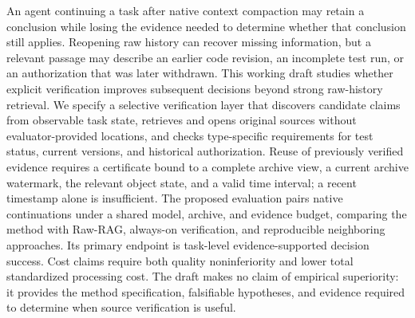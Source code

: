An agent continuing a task after native context compaction may retain a
conclusion while losing the evidence needed to determine whether that
conclusion still applies. Reopening raw history can recover missing
information, but a relevant passage may describe an earlier code
revision, an incomplete test run, or an authorization that was later
withdrawn. This working draft studies whether explicit verification
improves subsequent decisions beyond strong raw-history retrieval. We
specify a selective verification layer that discovers candidate claims
from observable task state, retrieves and opens original sources without
evaluator-provided locations, and checks type-specific requirements for
test status, current versions, and historical authorization. Reuse of
previously verified evidence requires a certificate bound to a complete
archive view, a current archive watermark, the relevant object state,
and a valid time interval; a recent timestamp alone is insufficient. The
proposed evaluation pairs native continuations under a shared model,
archive, and evidence budget, comparing the method with Raw-RAG,
always-on verification, and reproducible neighboring approaches. Its
primary endpoint is task-level evidence-supported decision success. Cost
claims require both quality noninferiority and lower total standardized
processing cost. The draft makes no claim of empirical superiority: it
provides the method specification, falsifiable hypotheses, and evidence
required to determine when source verification is useful.
